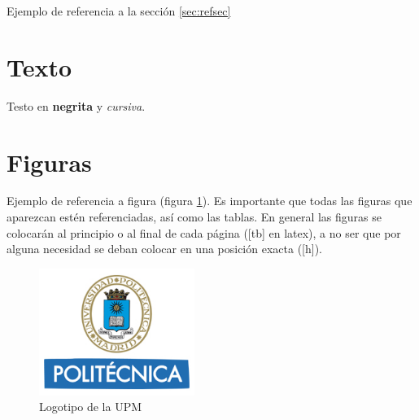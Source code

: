 Ejemplo de referencia a la sección \ref{sec:refsec}

\section{Texto}

Testo en \textbf{negrita} y \textit{cursiva}.

\section{Figuras}

Ejemplo de referencia a figura (figura \ref{fig:logo_upm}). Es importante que todas las figuras que aparezcan estén referenciadas, así como las tablas. En general las figuras se colocarán al principio o al final de cada página ([tb] en latex), a no ser que por alguna necesidad se deban colocar en una posición exacta ([h]).

\begin{figure}[tb]
\centering
\includegraphics[width=0.45\textwidth]{figuras/Logo_UPM.jpg}   
\caption{Logotipo de la UPM}
\label{fig:logo_upm}
\end{figure}